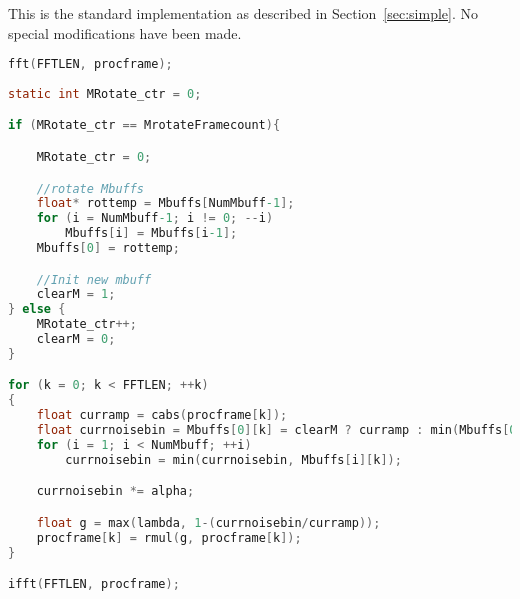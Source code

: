 \documentclass[11pt]{article} %
\begin{document}
This is the standard implementation as described in Section~\ref{sec:simple}. No special modifications have been made. 
  \begin{center}
    \begin{lstlisting}[language = C]
fft(FFTLEN, procframe);
									
static int MRotate_ctr = 0;

if (MRotate_ctr == MrotateFramecount){

	MRotate_ctr = 0;

	//rotate Mbuffs
	float* rottemp = Mbuffs[NumMbuff-1];
	for (i = NumMbuff-1; i != 0; --i)
		Mbuffs[i] = Mbuffs[i-1];
	Mbuffs[0] = rottemp;

	//Init new mbuff
	clearM = 1;
} else {
	MRotate_ctr++;
	clearM = 0;
}

for (k = 0; k < FFTLEN; ++k)
{
	float curramp = cabs(procframe[k]); 
	float currnoisebin = Mbuffs[0][k] = clearM ? curramp : min(Mbuffs[0][k], curramp);
	for (i = 1; i < NumMbuff; ++i)
		currnoisebin = min(currnoisebin, Mbuffs[i][k]);

	currnoisebin *= alpha;

	float g = max(lambda, 1-(currnoisebin/curramp));
	procframe[k] = rmul(g, procframe[k]);
}

ifft(FFTLEN, procframe);

    \end{lstlisting}
  \end{center}
\end{document}
